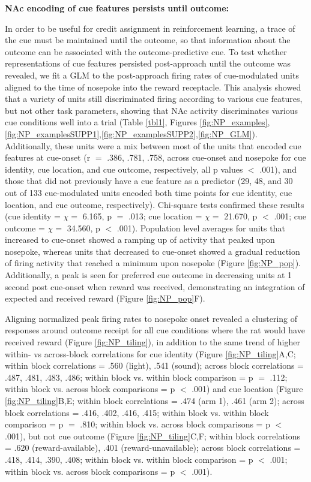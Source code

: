 \documentclass[11pt]{article}
\begin{document}
{\bf NAc encoding of cue features persists until outcome:}

In order to be useful for credit assignment in reinforcement learning, a trace of the cue must be maintained until the outcome, so that information about the outcome can be associated with the outcome-predictive cue. To test whether representations of cue features persisted post-approach until the outcome was revealed, we fit a GLM to the post-approach firing rates of cue-modulated units aligned to the time of nosepoke into the reward receptacle. This analysis
showed that a variety of units still discriminated firing according to various cue features, but not other task parameters, showing that NAc activity discriminates various cue conditions well into a trial (Table \ref{tbl1}, Figures \ref{fig:NP_examples},\ref{fig:NP_examplesSUPP1},\ref{fig:NP_examplesSUPP2},\ref{fig:NP_GLM}). Additionally, these units were a mix between most of the units that encoded cue features at cue-onset (r $=$ .386, .781, .758, across cue-onset and nosepoke for cue identity, cue location, and cue outcome, respectively, all p values $<$ .001), and those that did not previously have a cue feature as a predictor (29, 48, and 30 out of 133 cue-modulated units encoded both time points for cue identity, cue location, and cue outcome, respectively). Chi-square tests confirmed these results (cue identity =  $\chi =$ 6.165, p $=$ .013; cue location = $\chi =$ 21.670, p $<$ .001; cue outcome = $\chi =$ 34.560, p $<$ .001). Population level averages for units that increased to cue-onset showed a ramping up of activity that peaked upon nosepoke, whereas units that decreased to cue-onset showed a gradual reduction of firing activity that reached a minimum upon nosepoke (Figure \ref{fig:NP_pop}). Additionally, a peak is seen for preferred cue outcome in decreasing units at 1 second post cue-onset when reward was received, demonstrating an integration of expected and received reward (Figure \ref{fig:NP_pop}F). 

Aligning normalized peak firing rates to nosepoke onset revealed a clustering of responses around outcome receipt for all cue conditions where the rat would have received reward (Figure \ref{fig:NP_tiling}), in addition to the same trend of higher within- vs across-block correlations for cue identity (Figure \ref{fig:NP_tiling}A,C; within block correlations = .560 (light), .541 (sound); across block correlations = .487, .481, .483, .486; within block vs. within block comparison = p $=$ .112; within block vs. across block comparisons = p $<$ .001) and cue location (Figure \ref{fig:NP_tiling}B,E; within block correlations = .474 (arm 1), .461 (arm 2); across block correlations = .416, .402, .416, .415; within block vs. within block comparison = p $=$ .810; within block vs. across block comparisons = p $<$ .001), but not cue outcome (Figure \ref{fig:NP_tiling}C,F; within block correlations = .620 (reward-available), .401 (reward-unavailable); across block correlations = .418, .414, .390, .408; within block vs. within block comparison = p $<$ .001; within block vs. across block comparisons = p $<$ .001). 
\end{document}
